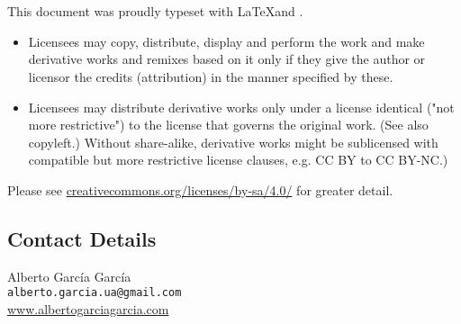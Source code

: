 \chapter*{}

This document was proudly typeset with \LaTeX and \TikZ.

\vspace{2 em}

\doclicenseThis

\begin{itemize}
    \item Licensees may copy, distribute, display and perform the work and make derivative works and remixes based on it only if they give the author or licensor the credits (attribution) in the manner specified by these. 
    \item Licensees may distribute derivative works only under a license identical ("not more restrictive") to the license that governs the original work. (See also copyleft.) Without share-alike, derivative works might be sublicensed with compatible but more restrictive license clauses, e.g. CC BY to CC BY-NC.)
\end{itemize}

Please see \url{creativecommons.org/licenses/by-sa/4.0/} for greater detail.

\vfill

\section*{Contact Details}

Alberto García García\\
\texttt{alberto.garcia.ua@gmail.com}\\
\url{www.albertogarciagarcia.com}